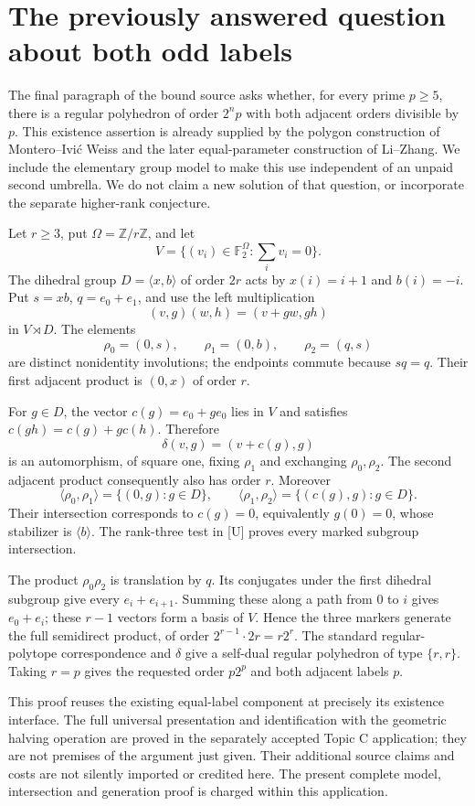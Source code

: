 \section{The previously answered question about both odd labels}
The final paragraph of the bound source asks whether, for every prime $p\ge5$, there is a regular polyhedron of order $2^n p$ with both adjacent orders divisible by $p$. This existence assertion is already supplied by the polygon construction of Montero--Ivi\'c Weiss and the later equal-parameter construction of Li--Zhang. We include the elementary group model to make this use independent of an unpaid second umbrella. We do not claim a new solution of that question, or incorporate the separate higher-rank conjecture.

Let $r\ge3$, put $\Omega=\mathbb Z/r\mathbb Z$, and let
\[
 V=\{(v_i)\in\mathbb F_2^\Omega:\sum_i v_i=0\}.
\]
The dihedral group $D=\langle x,b\rangle$ of order $2r$ acts by $x(i)=i+1$ and $b(i)=-i$. Put $s=xb$, $q=e_0+e_1$, and use the left multiplication
\[
 (v,g)(w,h)=(v+gw,gh)
\]
in $V\rtimes D$. The elements
\[
 \rho_0=(0,s),\qquad \rho_1=(0,b),\qquad \rho_2=(q,s)
\]
are distinct nonidentity involutions; the endpoints commute because $sq=q$. Their first adjacent product is $(0,x)$ of order $r$.

For $g\in D$, the vector $c(g)=e_0+ge_0$ lies in $V$ and satisfies $c(gh)=c(g)+gc(h)$. Therefore
\[
 \delta(v,g)=(v+c(g),g)
\]
is an automorphism, of square one, fixing $\rho_1$ and exchanging $\rho_0,\rho_2$. The second adjacent product consequently also has order $r$. Moreover
\[
 \langle\rho_0,\rho_1\rangle=\{(0,g):g\in D\},\qquad
 \langle\rho_1,\rho_2\rangle=\{(c(g),g):g\in D\}.
\]
Their intersection corresponds to $c(g)=0$, equivalently $g(0)=0$, whose stabilizer is $\langle b\rangle$. The rank-three test in [U] proves every marked subgroup intersection.

The product $\rho_0\rho_2$ is translation by $q$. Its conjugates under the first dihedral subgroup give every $e_i+e_{i+1}$. Summing these along a path from $0$ to $i$ gives $e_0+e_i$; these $r-1$ vectors form a basis of $V$. Hence the three markers generate the full semidirect product, of order $2^{r-1}\cdot2r=r2^r$. The standard regular-polytope correspondence and $\delta$ give a self-dual regular polyhedron of type $\{r,r\}$. Taking $r=p$ gives the requested order $p2^p$ and both adjacent labels $p$.

This proof reuses the existing equal-label component at precisely its existence interface. The full universal presentation and identification with the geometric halving operation are proved in the separately accepted Topic C application; they are not premises of the argument just given. Their additional source claims and costs are not silently imported or credited here. The present complete model, intersection and generation proof is charged within this application.

